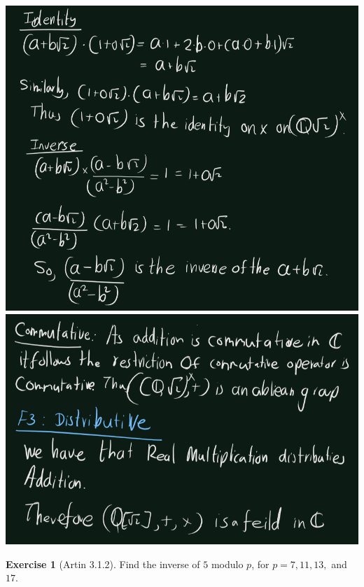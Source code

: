 \documentclass[
]{book}
\theoremstyle{definition}
\theoremstyle{definition}
\theoremstyle{definition}
\newtheorem{exercise}{Exercise}[chapter]
\theoremstyle{definition}
\theoremstyle{remark}
\begin{document}
\includegraphics{figures/ch_3/ex-1.1-3.png}
\includegraphics{figures/ch_3/ex-1.1-4.png}

\begin{exercise}[Artin 3.1.2]
\protect\hypertarget{exr:unnamed-chunk-247}{}\label{exr:unnamed-chunk-247}Find the inverse of \(5\) modulo \(p\), for \(p= 7, 11, 13,\) and \(17\).
\end{exercise}
\end{document}
